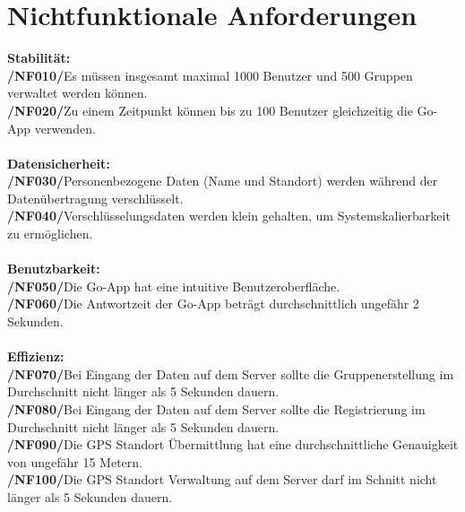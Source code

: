 \section{Nichtfunktionale Anforderungen}
  
\textbf{Stabilität:}\\
\textbf{/NF010/}Es müssen insgesamt maximal 1000 Benutzer und 500 Gruppen verwaltet werden können. \\
\textbf{/NF020/}Zu einem Zeitpunkt können bis zu 100 Benutzer gleichzeitig die Go-App verwenden. \\ \\
\textbf{Datensicherheit:}\\
\textbf{/NF030/}Personenbezogene Daten (Name und Standort) werden während der Datenübertragung verschlüsselt.\\
\textbf{/NF040/}Verschlüsselungsdaten werden klein gehalten, um Systemskalierbarkeit zu ermöglichen.\\ \\
\textbf{Benutzbarkeit:}\\
\textbf{/NF050/}Die Go-App hat eine intuitive Benutzeroberfläche.\\
\textbf{/NF060/}Die Antwortzeit der Go-App beträgt durchschnittlich ungefähr 2 Sekunden.\\ \\
\textbf{Effizienz:}\\
\textbf{/NF070/}Bei Eingang der Daten auf dem Server sollte die Gruppenerstellung im Durchschnitt nicht länger als 5 Sekunden dauern.\\
\textbf{/NF080/}Bei Eingang der Daten auf dem Server sollte die Registrierung im Durchschnitt nicht länger als 5 Sekunden dauern.\\
\textbf{/NF090/}Die GPS Standort Übermittlung hat eine durchschnittliche Genauigkeit von ungefähr 15 Metern.\\
\textbf{/NF100/}Die GPS Standort Verwaltung auf dem Server darf im Schnitt nicht länger als 5 Sekunden dauern.\\
